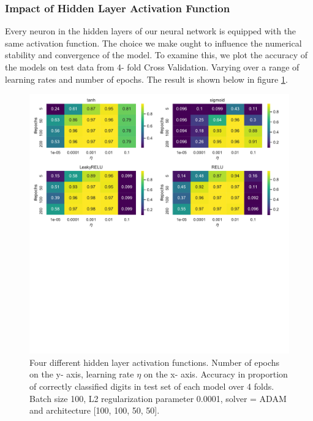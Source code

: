 \documentclass[11pt,a4paper,titlepage]{article}
\begin{document}
\subsubsection{Impact of Hidden Layer Activation Function}
Every neuron in the hidden layers of our neural network is equipped with the same activation function. The choice we make ought to influence the numerical stability and convergence of the model. To examine this, we plot the accuracy of the models on test data from 4- fold Cross Validation. Varying over a range of learning rates and number of epochs. The result is shown below in figure \ref{NN_activation}.

\begin{figure}[H]
\centering

\includegraphics[trim=0cm 12.0cm 0cm 0.0cm, clip=true,scale = 0.6]{Activation_function_d.pdf}
\caption[NN Hidden layer Activation]{Four different hidden layer activation functions. Number of epochs on the y- axis, learning rate $\eta$ on the x- axis. Accuracy in proportion of correctly classified digits in test set of each model over 4 folds. Batch size 100, L2 regularization parameter 0.0001, solver = ADAM and architecture [100, 100, 50, 50].}\label{NN_activation}
\end{figure}
\end{document}
